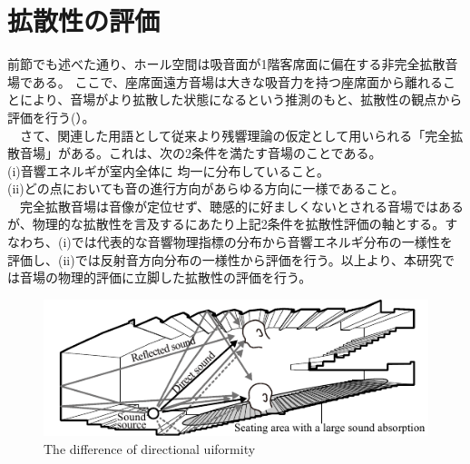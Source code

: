 \section{拡散性の評価}
前節でも述べた通り、ホール空間は吸音面が1階客席面に偏在する非完全拡散音場である。
ここで、座席面遠方音場は大きな吸音力を持つ座席面から離れることにより、音場がより拡散した状態になるという推測のもと、拡散性の観点から評価を行う(）。
\\　さて、関連した用語として従来より残響理論の仮定として用いられる「完全拡散音場」がある。これは、次の2条件を満たす音場のことである。
\\(i)音響エネルギが室内全体に 均一に分布していること。
\\(i\hspace{-.05em}i)どの点においても音の進行方向があらゆる方向に一様であること。
\\　完全拡散音場は音像が定位せず、聴感的に好ましくないとされる音場ではあるが、物理的な拡散性を言及するにあたり上記2条件を拡散性評価の軸とする。すなわち、(i)では代表的な音響物理指標の分布から音響エネルギ分布の一様性を評価し、(ii)では反射音方向分布の一様性から評価を行う。以上より、本研究では音場の物理的評価に立脚した拡散性の評価を行う。
\vspace{0.8cm}
\begin{figure}[htbp]
    \centering
    \includegraphics[keepaspectratio,scale=1.7]{01_att/concert_ear.pdf}
    \caption{\hspace{1mm}The difference of directional uiformity}
    \label{fig:far_improve}
\end{figure}


\pagebreak
